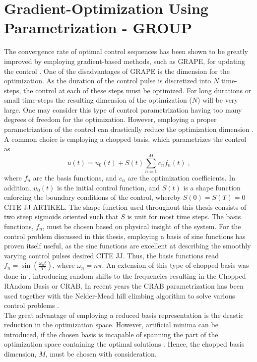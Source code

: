 \section{Gradient-Optimization Using Parametrization - GROUP} \label{sec:GROUP}
The convergence rate of optimal control sequences has been shown to be greatly improved by employing gradient-based methods, such as GRAPE, for updating the control \cite{Jager2014}.
One of the disadvantages of GRAPE is the dimension for the optimization. As the duration of the control pulse is discretized into $N$ time-steps, the control at each of these steps must be optimized. For long durations or small time-steps the resulting dimension of the optimization ($N$) will be very large. One may consider this type of control parametrization having too many degrees of freedom for the optimization. 
However, employing a proper parametrization of the control can drastically reduce the optimization dimension \cite{Winckel2008}.\\
A common choice is employing a chopped basis, which parametrizes the control as
\begin{equation}
	u(t) = u_0 (t) + S(t) \sum_{n=1}^{M} c_n f_n (t) \; , \label{eq:controlParametrization}
\end{equation}   
where $f_n$ are the basis functions, and $c_n$ are the optimization coefficients. In addition, $u_0 (t)$ is the initial control function, and $S (t)$ is a shape function enforcing the boundary conditions of the control, whereby $S(0) = S(T) = 0$ CITE JJ ARTIKEL. The shape function used throughout this thesis consists of two steep sigmoids oriented such that $S$ is unit for most time steps. The basis functions, $f_n$, must be chosen based on physical insight of the system. For the control problem discussed in this thesis, employing a basis of sine functions has proven itself useful, as the sine functions are excellent at describing the smoothly varying control pulses desired CITE JJ. Thus, the basis functions read $f_n = \sin \left( \frac{\omega_n t}{T} \right)$, where $\omega_n = n \pi$.
An extension of this type of chopped basis was done in \cite{Doria2011,Caneva2011crab}, introducing random shifts to the frequencies resulting in the Chopped RAndom Basis or \textsc{CRAB}. In recent years the \textsc{CRAB} parametrization has been used together with the Nelder-Mead hill climbing algorithm to solve various control problems \cite{Doria2011,Caneva2011,FrankBloch,Lloyd2014}.\\
The great advantage of employing a reduced basis representation is the drastic reduction in the optimization space. However, artificial minima can be introduced, if the chosen basis is incapable of spanning the part of the optimization space containing the optimal solutions \cite{Rach2015}. Hence, the chopped basis dimension, $M$, must be chosen with consideration.\\

